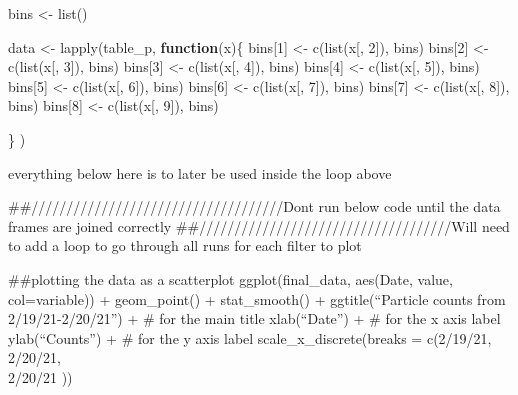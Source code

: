 \documentclass[
]{article}
\newenvironment{Shaded}{\begin{snugshade}}{\end{snugshade}}
\newcommand{\ControlFlowTok}[1]{\textcolor[rgb]{0.13,0.29,0.53}{\textbf{#1}}}
\newcommand{\DecValTok}[1]{\textcolor[rgb]{0.00,0.00,0.81}{#1}}
\newcommand{\FunctionTok}[1]{\textcolor[rgb]{0.00,0.00,0.00}{#1}}
\newcommand{\NormalTok}[1]{#1}
\newcommand{\OtherTok}[1]{\textcolor[rgb]{0.56,0.35,0.01}{#1}}
\begin{document}
\begin{Shaded}
\begin{Highlighting}[]
\NormalTok{bins }\OtherTok{\textless{}{-}} \FunctionTok{list}\NormalTok{()}


\NormalTok{data }\OtherTok{\textless{}{-}} \FunctionTok{lapply}\NormalTok{(table\_p, }\ControlFlowTok{function}\NormalTok{(x)\{}
\NormalTok{  bins[}\DecValTok{1}\NormalTok{] }\OtherTok{\textless{}{-}} \FunctionTok{c}\NormalTok{(}\FunctionTok{list}\NormalTok{(x[, }\DecValTok{2}\NormalTok{]), bins)}
\NormalTok{  bins[}\DecValTok{2}\NormalTok{] }\OtherTok{\textless{}{-}} \FunctionTok{c}\NormalTok{(}\FunctionTok{list}\NormalTok{(x[, }\DecValTok{3}\NormalTok{]), bins)}
\NormalTok{  bins[}\DecValTok{3}\NormalTok{] }\OtherTok{\textless{}{-}} \FunctionTok{c}\NormalTok{(}\FunctionTok{list}\NormalTok{(x[, }\DecValTok{4}\NormalTok{]), bins)}
\NormalTok{  bins[}\DecValTok{4}\NormalTok{] }\OtherTok{\textless{}{-}} \FunctionTok{c}\NormalTok{(}\FunctionTok{list}\NormalTok{(x[, }\DecValTok{5}\NormalTok{]), bins)}
\NormalTok{  bins[}\DecValTok{5}\NormalTok{] }\OtherTok{\textless{}{-}} \FunctionTok{c}\NormalTok{(}\FunctionTok{list}\NormalTok{(x[, }\DecValTok{6}\NormalTok{]), bins)}
\NormalTok{  bins[}\DecValTok{6}\NormalTok{] }\OtherTok{\textless{}{-}} \FunctionTok{c}\NormalTok{(}\FunctionTok{list}\NormalTok{(x[, }\DecValTok{7}\NormalTok{]), bins)}
\NormalTok{  bins[}\DecValTok{7}\NormalTok{] }\OtherTok{\textless{}{-}} \FunctionTok{c}\NormalTok{(}\FunctionTok{list}\NormalTok{(x[, }\DecValTok{8}\NormalTok{]), bins)}
\NormalTok{  bins[}\DecValTok{8}\NormalTok{] }\OtherTok{\textless{}{-}} \FunctionTok{c}\NormalTok{(}\FunctionTok{list}\NormalTok{(x[, }\DecValTok{9}\NormalTok{]), bins)}
  
\NormalTok{\}}
\NormalTok{)}
\end{Highlighting}
\end{Shaded}

everything below here is to later be used inside the loop above

\#\#////////////////////////////////////Dont run below code until the
data frames are joined correctly
\#\#////////////////////////////////////Will need to add a loop to go
through all runs for each filter to plot

\#\#plotting the data as a scatterplot ggplot(final\_data, aes(Date,
value, col=variable)) + geom\_point() + stat\_smooth() +
ggtitle(``Particle counts from 2/19/21-2/20/21'') + \# for the main
title xlab(``Date'') + \# for the x axis label ylab(``Counts'') + \# for
the y axis label scale\_x\_discrete(breaks = c(2/19/21, 2/20/21,\\
2/20/21 ))
\end{document}
